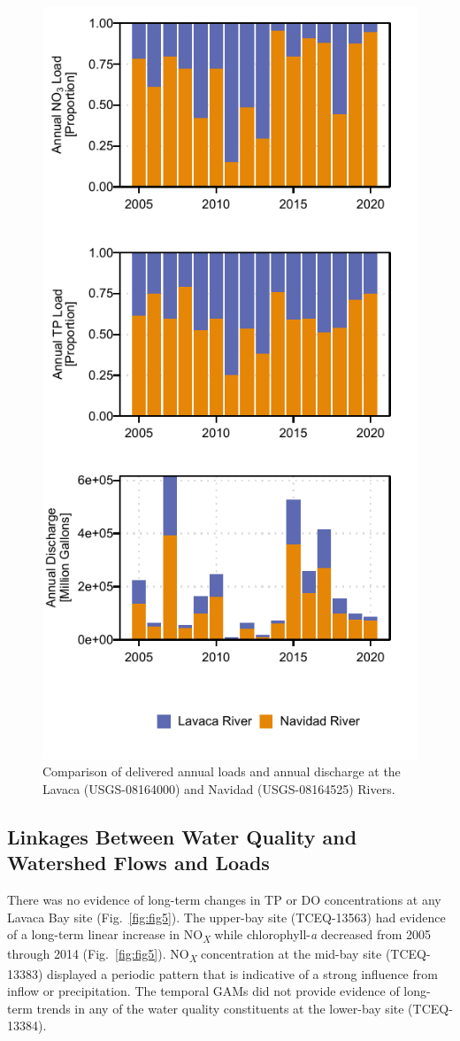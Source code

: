\documentclass[fleqn,10pt,lineno]{wlpeerj} %
\begin{document}
\begin{figure}

{\centering \includegraphics[width=0.5\linewidth,]{Schramm-2023-08-PeerJ_files/figure-latex/fig4} 

}

\caption{Comparison of delivered annual loads and annual discharge at the Lavaca (USGS-08164000) and Navidad (USGS-08164525) Rivers.}\label{fig:fig4}
\end{figure}

\hypertarget{linkages-between-water-quality-and-watershed-flows-and-loads}{%
\subsection*{Linkages Between Water Quality and Watershed Flows and
Loads}\label{linkages-between-water-quality-and-watershed-flows-and-loads}}

There was no evidence of long-term changes in TP or DO concentrations at
any Lavaca Bay site (Fig.~\ref{fig:fig5}). The upper-bay site
(TCEQ-13563) had evidence of a long-term linear increase in
NO\textsubscript{\emph{X}} while chlorophyll-\emph{a} decreased from
2005 through 2014 (Fig.~\ref{fig:fig5}). NO\textsubscript{\emph{X}}
concentration at the mid-bay site (TCEQ-13383) displayed a periodic
pattern that is indicative of a strong influence from inflow or
precipitation. The temporal GAMs did not provide evidence of long-term
trends in any of the water quality constituents at the lower-bay site
(TCEQ-13384).
\end{document}
